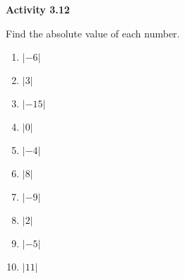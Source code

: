 \vspace{0.3ex}
\noindent\textbf{Activity 3.12}

\vspace{0.2ex}

Find the absolute value of each number.
\begin{multicols}{3}
\begin{enumerate}[noitemsep, label = \color{blue}\arabic*. ]
    \item \(|-6|\)
    \item \(|3|\)
    \item \(|-15|\)
    \item \(|0|\)
    \item \(|-4|\)
    \item \(|8|\)
    \item \(|-9|\)
    \item \(|2|\)
    \item \(|-5|\)
    \item \(|11|\)
\end{enumerate}
\end{multicols}

